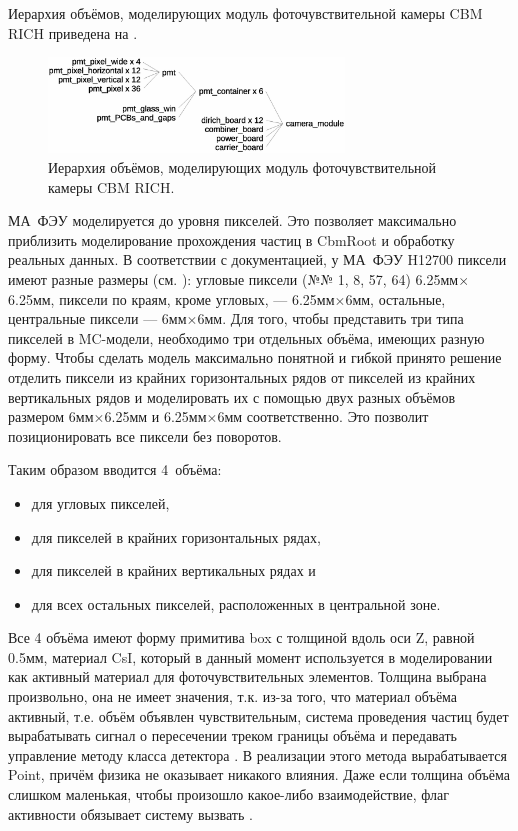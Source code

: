 Иерархия объёмов, моделирующих модуль фоточувствительной камеры CBM RICH приведена на .

\begin{figure}[H]
\centering
\includegraphics[width=0.7\textwidth]{pictures/Module_geoStructure.eps}
\caption{Иерархия объёмов, моделирующих модуль фоточувствительной камеры CBM RICH.}
\label{fig:Module_geoStructure}
\end{figure}

МА~ФЭУ моделируется до уровня пикселей. Это позволяет максимально приблизить моделирование прохождения частиц в CbmRoot и обработку реальных данных. В соответствии с документацией, у МА~ФЭУ H12700 пиксели имеют разные размеры (см. ): угловые пиксели (№№ 1, 8, 57, 64) 6.25мм$\times$6.25мм, пиксели по краям, кроме угловых, --- 6.25мм$\times$6мм, остальные, центральные пиксели --- 6мм$\times$6мм. Для того, чтобы представить три типа пикселей в MC-модели, необходимо три отдельных объёма, имеющих разную форму. Чтобы сделать модель максимально понятной и гибкой принято решение отделить пиксели из крайних горизонтальных рядов от пикселей из крайних вертикальных рядов и моделировать их с помощью двух разных объёмов размером 6мм$\times$6.25мм и 6.25мм$\times$6мм соответственно. Это позволит позиционировать все пиксели без поворотов.

Таким образом вводится 4~объёма:
\begin{itemize}
\itemsep0pt
\item {} для угловых пикселей,
\item {} для пикселей в крайних горизонтальных рядах,
\item {} для пикселей в крайних вертикальных рядах и
\item {} для всех остальных пикселей, расположенных в центральной зоне.
\end{itemize}
Все 4 объёма имеют форму примитива box с толщиной вдоль оси Z, равной 0.5мм, материал CsI, который в данный момент используется в моделировании как активный материал для фоточувствительных элементов. Толщина выбрана произвольно, она не имеет значения, т.к. из-за того, что материал объёма активный, т.е. объём объявлен чувствительным, система проведения частиц будет вырабатывать сигнал о пересечении треком границы объёма и передавать управление методу  класса детектора . В реализации этого метода вырабатывается Point, причём физика не оказывает никакого влияния. Даже если толщина объёма слишком маленькая, чтобы произошло какое-либо взаимодействие, флаг активности обязывает систему вызвать .

